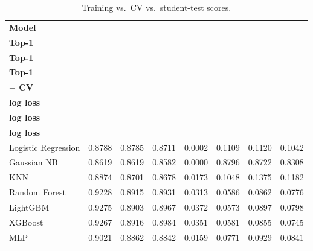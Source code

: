 \documentclass[11pt,a4paper]{article}
\begin{document}
\begin{table}[H]
\centering
\small
\begin{tabular}{@{}lccccccc@{}}
\toprule
\textbf{Model} & \makecell{\textbf{Train}\\\textbf{Top-1}} & \makecell{\textbf{CV}\\\textbf{Top-1}} & \makecell{\textbf{Test}\\\textbf{Top-1}} &
\makecell{\textbf{Train}\\\textbf{$-$ CV}} & \makecell{\textbf{Train}\\\textbf{log loss}} & \makecell{\textbf{CV}\\\textbf{log loss}} & \makecell{\textbf{Test}\\\textbf{log loss}} \\
\midrule
Logistic Regression & 0.8788 & 0.8785 & 0.8711 & 0.0002 & 0.1109 & 0.1120 & 0.1042 \\
Gaussian NB & 0.8619 & 0.8619 & 0.8582 & 0.0000 & 0.8796 & 0.8722 & 0.8308 \\
KNN & 0.8874 & 0.8701 & 0.8678 & 0.0173 & 0.1048 & 0.1375 & 0.1182 \\
Random Forest & 0.9228 & 0.8915 & 0.8931 & 0.0313 & 0.0586 & 0.0862 & 0.0776 \\
LightGBM & 0.9275 & 0.8903 & 0.8967 & 0.0372 & 0.0573 & 0.0897 & 0.0798 \\
\rowcolor{pick}
XGBoost & 0.9267 & 0.8916 & 0.8984 & 0.0351 & 0.0581 & 0.0855 & 0.0745 \\
MLP & 0.9021 & 0.8862 & 0.8842 & 0.0159 & 0.0771 & 0.0929 & 0.0841 \\
\bottomrule
\end{tabular}
\caption{Training vs.\ CV vs.\ student-test scores.}
\end{table}
\end{document}
